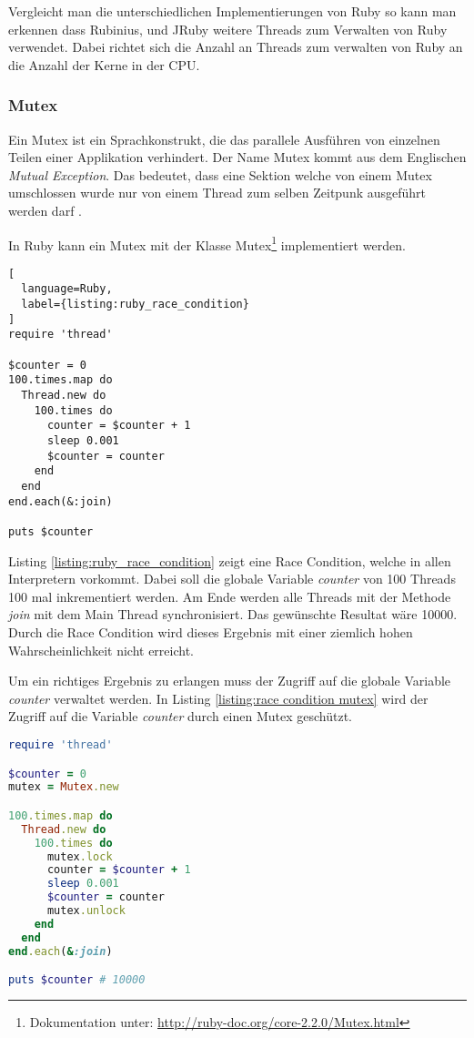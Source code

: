 Vergleicht man die unterschiedlichen Implementierungen von Ruby so kann man erkennen dass Rubinius, und JRuby weitere Threads zum Verwalten von Ruby verwendet. Dabei richtet sich die Anzahl an Threads zum verwalten von Ruby an die Anzahl der Kerne in der CPU.

\subsubsection{Mutex}
Ein Mutex ist ein Sprachkonstrukt, die das parallele Ausführen von einzelnen Teilen einer Applikation verhindert. Der Name Mutex kommt aus dem Englischen \emph{Mutual Exception}. Das bedeutet, dass eine Sektion welche von einem Mutex umschlossen wurde nur von einem Thread zum selben Zeitpunk ausgeführt werden darf \cite[p. 81]{Sto2013}. 

In Ruby kann ein Mutex mit der Klasse Mutex\footnote{Dokumentation unter:  \url{http://ruby-doc.org/core-2.2.0/Mutex.html}} implementiert werden.

\begin{lstlisting}[
  language=Ruby,
  label={listing:ruby_race_condition}
]
require 'thread'

$counter = 0
100.times.map do
  Thread.new do
    100.times do
      counter = $counter + 1
      sleep 0.001
      $counter = counter
    end
  end
end.each(&:join)

puts $counter
\end{lstlisting}

Listing \ref{listing:ruby_race_condition} zeigt eine Race Condition, welche in allen Interpretern vorkommt. Dabei soll die globale Variable \emph{counter} von 100 Threads 100 mal inkrementiert werden. Am Ende werden alle Threads mit der Methode \emph{join} mit dem Main Thread synchronisiert. Das gewünschte Resultat wäre 10000. Durch die Race Condition wird dieses Ergebnis mit einer ziemlich hohen Wahrscheinlichkeit nicht erreicht.

Um ein richtiges Ergebnis zu erlangen muss der Zugriff auf die globale Variable \emph{counter} verwaltet werden. In Listing \ref{listing:race condition mutex} wird der Zugriff auf die Variable \emph{counter} durch einen Mutex geschützt. 

\begin{lstlisting}[language=Ruby,label={listing:race condition mutex}]
require 'thread'

$counter = 0
mutex = Mutex.new

100.times.map do
  Thread.new do
    100.times do
      mutex.lock
      counter = $counter + 1
      sleep 0.001
      $counter = counter
      mutex.unlock
    end
  end
end.each(&:join)

puts $counter # 10000
\end{lstlisting}

